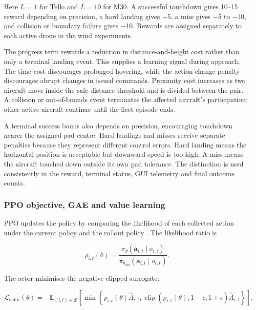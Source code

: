 Here \(L=1\) for Tello and \(L=10\) for M30. A successful touchdown gives 10--15 reward depending on precision, a hard landing gives −5, a miss gives −5 to −10, and collision or boundary failure gives −10. Rewards are assigned separately to each active drone in the wind experiments.

The progress term rewards a reduction in distance-and-height cost rather than only a terminal landing event. This supplies a learning signal during approach. The time cost discourages prolonged hovering, while the action-change penalty discourages abrupt changes in issued commands. Proximity cost increases as two aircraft move inside the safe-distance threshold and is divided between the pair. A collision or out-of-bounds event terminates the affected aircraft's participation; other active aircraft continue until the fleet episode ends.

A terminal success bonus also depends on precision, encouraging touchdown nearer the assigned pad centre. Hard landings and misses receive separate penalties because they represent different control errors. Hard landing means the horizontal position is acceptable but downward speed is too high. A miss means the aircraft touched down outside its own pad tolerance. The distinction is used consistently in the reward, terminal status, GUI telemetry and final outcome counts.

\hypertarget{ppo-objective-gae-and-value-learning}{%
\subsubsection{PPO objective, GAE and value learning}\label{ppo-objective-gae-and-value-learning}}

PPO updates the policy by comparing the likelihood of each collected action under the current policy and the rollout policy \cite{ppo2017}. The likelihood ratio is

\begin{equation}\label{eq:ratio}
\rho_{i,t}(\theta)=\frac{\pi_\theta(\widetilde{\mathbf a}_{i,t}\mid o_{i,t})}{\pi_{\theta_{\mathrm{old}}}(\widetilde{\mathbf a}_{i,t}\mid o_{i,t})}.
\end{equation}

The actor minimises the negative clipped surrogate:

\begin{equation}\label{eq:ppo}
\mathcal L_{\mathrm{actor}}(\theta)=-\mathbb E_{(i,t)\in\mathcal B}\!\left[
\min\!\left\{\rho_{i,t}(\theta)\widehat A_{i,t},
\operatorname{clip}(\rho_{i,t}(\theta),1-\epsilon,1+\epsilon)\widehat A_{i,t}\right\}\right].
\end{equation}

